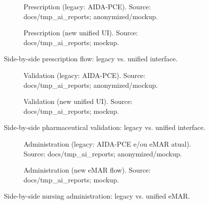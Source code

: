\begin{figure}[htbp]
    \centering
    \begin{subfigure}[t]{0.47\textwidth}
        \centering
        \caption{Prescription (legacy: AIDA-PCE). Source: docs/tmp\_ai\_reports; anonymized/mockup.}
        \label{fig:prescription_legacy}
    \end{subfigure}
    \begin{subfigure}[t]{0.47\textwidth}
        \centering
        \caption{Prescription (new unified UI). Source: docs/tmp\_ai\_reports; mockup.}
        \label{fig:prescription_new}
    \end{subfigure}
    \caption{Side-by-side prescription flow: legacy vs. unified interface.}
\end{figure}

\begin{figure}[htbp]
    \centering
    \begin{subfigure}[t]{0.40\textwidth}
        \centering
        \caption{Validation (legacy: AIDA-PCE). Source: docs/tmp\_ai\_reports; anonymized/mockup.}
        \label{fig:validation_legacy}
    \end{subfigure}
    \begin{subfigure}[t]{0.40\textwidth}
        \centering
        \caption{Validation (new unified UI). Source: docs/tmp\_ai\_reports; mockup.}
        \label{fig:validation_new}
    \end{subfigure}
    \caption{Side-by-side pharmaceutical validation: legacy vs. unified interface.}
\end{figure}

\begin{figure}[htbp]
    \centering
    \begin{subfigure}[t]{0.40\textwidth}
        \centering
        \caption{Administration (legacy: AIDA-PCE e/ou eMAR atual). Source: docs/tmp\_ai\_reports; anonymized/mockup.}
        \label{fig:administration_legacy}
    \end{subfigure}
    \begin{subfigure}[t]{0.40\textwidth}
        \centering
        \caption{Administration (new eMAR flow). Source: docs/tmp\_ai\_reports; mockup.}
        \label{fig:administration_new}
    \end{subfigure}
    \caption{Side-by-side nursing administration: legacy vs. unified eMAR.}
\end{figure}

